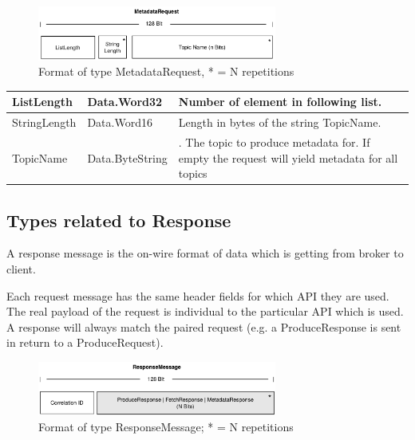 \begin{figure}[H]
    \centering
    \includegraphics[width=0.7\textwidth]{images/impl-prot-types-metadataRequest.png}
    \caption{Format of type MetadataRequest, * = N repetitions}
    \label{fig:impl-prot-types-ftPartition}
\end{figure}

\begin{table}[H]
\centering
\begin{tabular}{ l  l  p{10cm} }
\hline
ListLength    & Data.Word32 & Number of element in following list.                                                                                             \\ \hline
StringLength      & Data.Word16     & Length in bytes of the string TopicName.              \\ \hline
TopicName         & Data.ByteString & . The topic to produce metadata for. If
empty the request will yield metadata for all topics  \\ \hline
\end{tabular}
\end{table}

\subsection{Types related to Response}
A response message is the on-wire format of data which is getting from broker to
client.

Each request message has the same header fields for which API they are used. 
The real payload of the request is individual to the particular API which is
used. A response will always match the paired request (e.g. a ProduceResponse is
sent in return to a ProduceRequest).

\begin{figure}[H]
    \centering
    \includegraphics[width=0.7\textwidth]{images/impl-prot-types-responseMessage.png}
    \caption{Format of type ResponseMessage; * = N repetitions}
    \label{fig:impl-prot-types-responseMessage}
\end{figure}

